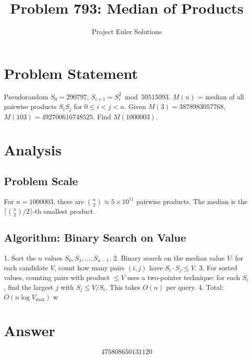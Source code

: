 \documentclass[11pt]{article}
\title{Problem 793: Median of Products}
\author{Project Euler Solutions}
\date{}
\begin{document}
\maketitle
\section{Problem Statement}
Pseudorandom $S_0=290797$, $S_{i+1}=S_i^2 \bmod 50515093$. $M(n)$ = median of all pairwise products $S_iS_j$ for $0 \le i < j < n$. Given $M(3) = 3878983057768$, $M(103) = 492700616748525$. Find $M(1000003)$.
\section{Analysis}
\subsection*{Problem Scale}

For $n = 1000003$, there are $\binom{n}{2} \approx 5 \times 10^{11}$ pairwise products. The median is the $\lceil \binom{n}{2}/2 \rceil$-th smallest product.

\subsection*{Algorithm: Binary Search on Value}

1. Sort the $n$ values $S_0, S_1, \ldots, S_{n-1}$.
2. Binary search on the median value $V$: for each candidate $V$, count how many pairs $(i,j)$ have $S_i \cdot S_j \le V$.
3. For sorted values, counting pairs with product $\le V$ uses a two-pointer technique: for each $S_i$, find the largest $j$ with $S_j \le V/S_i$. This takes $O(n)$ per query.
4. Total: $O(n \log V_{\max})$ w
\section{Answer}

\[
\boxed{475808650131120}
\]
\end{document}

